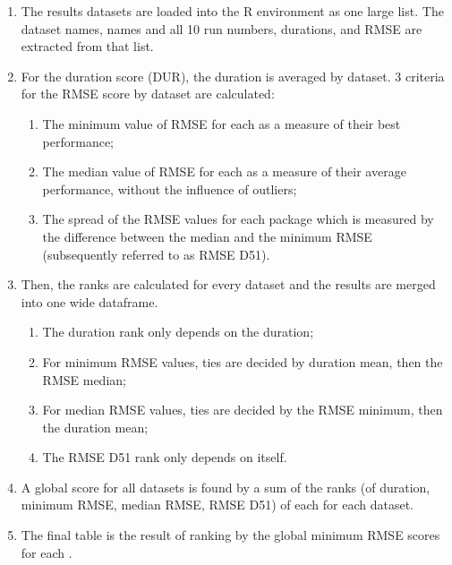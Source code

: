 \begin{enumerate}
\def\labelenumi{\arabic{enumi}.}
\tightlist
\item
  The results datasets are loaded into the R environment as one large
  list. The dataset names,  names and all 10 run
  numbers, durations, and RMSE are extracted from that list.
\item
  For the duration score (DUR), the duration is averaged by dataset. 3
  criteria for the RMSE score by dataset are calculated:

  \begin{enumerate}
  \def\labelenumii{\alph{enumii}.}
  \tightlist
  \item
    The minimum value of RMSE for each  as a
    measure of their best performance;
  \item
    The median value of RMSE for each  as a
    measure of their average performance, without the influence of
    outliers;
  \item
    The spread of the RMSE values for each package which is measured by
    the difference between the median and the minimum RMSE (subsequently
    referred to as RMSE D51).
  \end{enumerate}
\item
  Then, the ranks are calculated for every dataset and the results are
  merged into one wide dataframe.

  \begin{enumerate}
  \def\labelenumii{\alph{enumii}.}
  \tightlist
  \item
    The duration rank only depends on the duration;
  \item
    For minimum RMSE values, ties are decided by duration mean, then the
    RMSE median;
  \item
    For median RMSE values, ties are decided by the RMSE minimum, then
    the duration mean;
  \item
    The RMSE D51 rank only depends on itself.
  \end{enumerate}
\item
  A global score for all datasets is found by a sum of the ranks (of
  duration, minimum RMSE, median RMSE, RMSE D51) of each
   for each dataset.
\item
  The final table is the result of ranking by the global minimum RMSE
  scores for each .
\end{enumerate}

